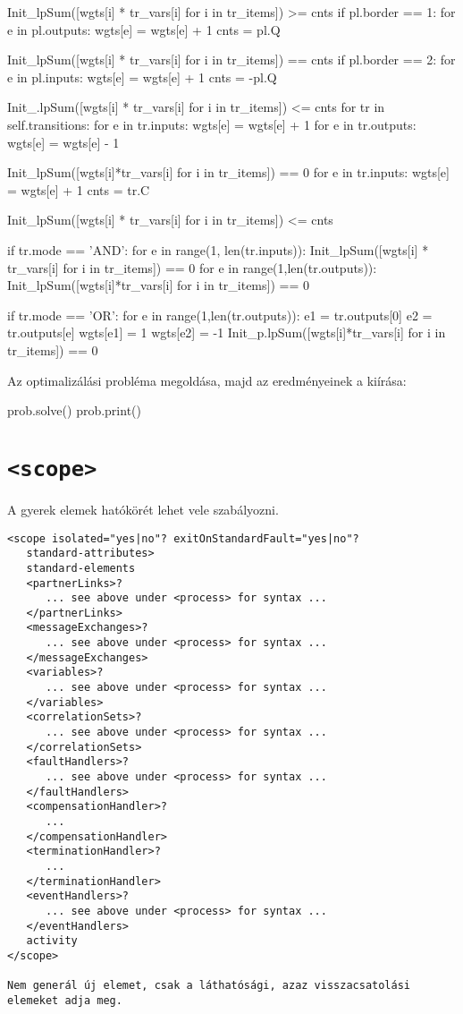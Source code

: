 \begin{python}
Init_lpSum([wgts[i] * tr_vars[i] for i in tr_items]) >= cnts
if pl.border == 1:
    for e in pl.outputs:
        wgts[e] = wgts[e] + 1
    cnts = pl.Q

Init_lpSum([wgts[i] * tr_vars[i] for i in tr_items]) == cnts
if pl.border == 2:
    for e in pl.inputs:
        wgts[e] = wgts[e] + 1
    cnts = -pl.Q
    
Init_.lpSum([wgts[i] * tr_vars[i] for i in tr_items]) <= cnts
for tr in self.transitions:
    for e in tr.inputs:
        wgts[e] = wgts[e] + 1
    for e in tr.outputs:
        wgts[e] = wgts[e] - 1
                
Init_lpSum([wgts[i]*tr_vars[i] for i in tr_items]) == 0
    for e in tr.inputs:
        wgts[e] = wgts[e] + 1
    cnts = tr.C
    
Init_lpSum([wgts[i] * tr_vars[i] for i in tr_items]) <= cnts

if tr.mode == 'AND':
    for e in range(1, len(tr.inputs)):
        Init_lpSum([wgts[i] * tr_vars[i] for i in tr_items]) == 0
    for e in range(1,len(tr.outputs)):
        Init_lpSum([wgts[i]*tr_vars[i] for i in tr_items]) == 0

if tr.mode == 'OR':
    for e in range(1,len(tr.outputs)):
        e1 = tr.outputs[0]
        e2 = tr.outputs[e]
        wgts[e1] =  1
        wgts[e2] =  -1
        Init_p.lpSum([wgts[i]*tr_vars[i] for i in tr_items]) == 0
\end{python}
Az optimalizálási probléma megoldása, majd az eredményeinek a kiírása:
\begin{python}
prob.solve()
prob.print()
\end{python}
\section{\texttt{<scope>}}

A gyerek elemek hatókörét lehet vele szabályozni.
\begin{verbatim}
<scope isolated="yes|no"? exitOnStandardFault="yes|no"?
   standard-attributes>
   standard-elements
   <partnerLinks>?
      ... see above under <process> for syntax ...
   </partnerLinks>
   <messageExchanges>?
      ... see above under <process> for syntax ...
   </messageExchanges>
   <variables>?
      ... see above under <process> for syntax ...
   </variables>
   <correlationSets>?
      ... see above under <process> for syntax ...
   </correlationSets>
   <faultHandlers>?
      ... see above under <process> for syntax ...
   </faultHandlers>
   <compensationHandler>?
      ...
   </compensationHandler>
   <terminationHandler>?
      ...
   </terminationHandler>
   <eventHandlers>?
      ... see above under <process> for syntax ...
   </eventHandlers>
   activity
</scope>

Nem generál új elemet, csak a láthatósági, azaz visszacsatolási elemeket adja meg. 
\end{verbatim}

